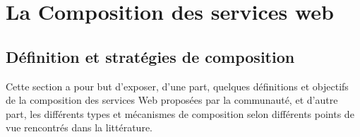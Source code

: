 \chapter{La Composition des services web}



  

  

\newpage

  \section{Définition et stratégies de composition}
  \label{sec:defin-et-caract}

  Cette section a pour but d'exposer, d'une part, quelques définitions
  et objectifs de la composition des services Web proposées par la
  communauté, et d'autre part, les différents types et mécanismes de
  composition selon différents points de vue rencontrés dans la
  littérature.
  
